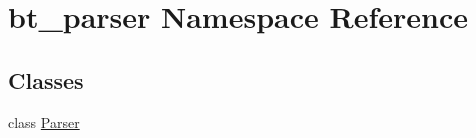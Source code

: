 \hypertarget{namespacebt__parser}{\section{bt\-\_\-parser Namespace Reference}
\label{namespacebt__parser}
}
\subsection*{Classes}
\begin{DoxyCompactItemize}
\item 
class \hyperlink{classbt__parser_1_1Parser}{Parser}
\end{DoxyCompactItemize}
